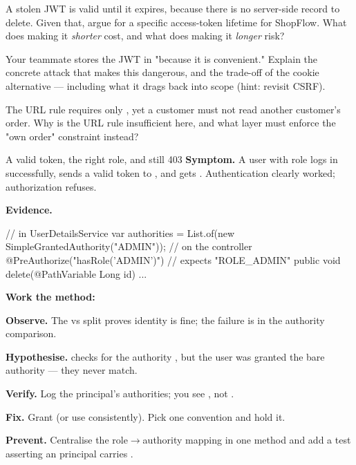 \begin{thinkbox}
A stolen JWT is valid until it expires, because there is no server-side record to delete. Given that, argue for a specific access-token lifetime for ShopFlow. What does making it \emph{shorter} cost, and what does making it \emph{longer} risk?
\end{thinkbox}

\begin{thinkbox}
Your teammate stores the JWT in  "because it is convenient." Explain the concrete attack that makes this dangerous, and the trade-off of the  cookie alternative --- including what it drags back into scope (hint: revisit CSRF).
\end{thinkbox}

\begin{thinkbox}
The URL rule  requires only , yet a customer must not read another customer's order. Why is the URL rule insufficient here, and what layer must enforce the "own order" constraint instead?
\end{thinkbox}


\begin{debuglab}{A valid token, the right role, and still 403}
\textbf{Symptom.} A user with role  logs in successfully, sends a valid token to , and gets . Authentication clearly worked; authorization refuses.

\smallskip\textbf{Evidence.}
\begin{javabox}
// in UserDetailsService
var authorities = List.of(new SimpleGrantedAuthority("ADMIN"));
// on the controller
@PreAuthorize("hasRole('ADMIN')")   // expects "ROLE_ADMIN"
public void delete(@PathVariable Long id) { ... }
\end{javabox}

\textbf{Work the method:}
\begin{tickcheck}
  \item \textbf{Observe.} The  vs  split proves identity is fine; the failure is in the authority comparison.
  \item \textbf{Hypothesise.}  checks for the authority , but the user was granted the bare authority  --- they never match.
  \item \textbf{Verify.} Log the principal's authorities; you see \code{[ADMIN]}, not .
  \item \textbf{Fix.} Grant  (or use  consistently). Pick one convention and hold it.
  \item \textbf{Prevent.} Centralise the role$\rightarrow$authority mapping in one method and add a test asserting an  principal carries .
\end{tickcheck}
\end{debuglab}

